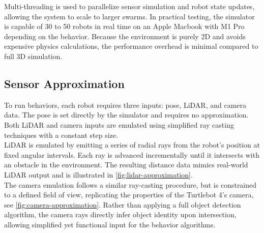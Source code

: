 Multi-threading is used to parallelize sensor simulation and robot state updates, allowing the system to scale to larger swarms. In practical testing, the simulator is capable of 30 to 50 robots in real time on an Apple Macbook with M1 Pro \cite{macbook} depending on the behavior. Because the environment is purely 2D and avoids expensive physics calculations, the performance overhead is minimal compared to full 3D simulation.

\subsection{Sensor Approximation}
To run behaviors, each robot requires three inputs: pose, LiDAR, and camera data. The pose is set directly by the simulator and requires no approximation. Both LiDAR and camera inputs are emulated using simplified ray casting techniques with a constant step size. \\

LiDAR is emulated by emitting a series of radial rays from the robot's position at fixed angular intervals. Each ray is advanced incrementally until it intersects with an obstacle in the environment. The resulting distance data mimics real-world LiDAR output and is illustrated in \cref{fig:lidar-approximation}. \\

The camera emulation follows a similar ray-casting procedure, but is constrained to a defined field of view, replicating the properties of the Turtlebot 4’s camera, see \cref{fig:camera-approximation}. Rather than applying a full object detection algorithm, the camera rays directly infer object identity upon intersection, allowing simplified yet functional input for the behavior algorithms.

